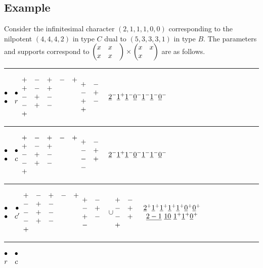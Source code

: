 \documentclass[11pt ,reqno]{amsart}
\begin{document}
\subsection{Example}\label{3.7} Consider the infinitesimal character
$(2,1,1,1,0,0)$ corresponding to the nilpotent $(4,4,4,2)$ in type $C$ dual to
$(5,3,3,3,1)$ in type $B.$ The parameters and supports correspond to
$\begin{pmatrix} x&x\\x&x&\end{pmatrix}\times\begin{pmatrix} x&x\\x&\end{pmatrix}$ are as follows.

\bigskip
\hrule
\medskip
$\begin{matrix} \bullet&\bullet\\ \bullet&r\end{matrix}$\qquad  
$\begin{matrix} +&-&+&-&+\\ +&-&+&&\\-&+&-&&\\-&+&-&&\\+&&&&\end{matrix}$
\qquad $\begin{matrix} +&-\\-&+\\+&-\\+&&\end{matrix}$
\qquad ${\underline{2}}^-{\underline{1}}^+{\underline{1}}^-{\underline{0}}^-{\underline{1}}^-{\underline{1}}^-{\underline{0}}^-$
\hfill
\medskip
\hrule
\medskip
$\begin{matrix} \bullet&\bullet\\ \bullet&c\end{matrix}$\qquad  
$\begin{matrix} +&-&+&-&+\\ +&-&+&&\\-&+&-&&\\-&+&-&&\\+&&&&\end{matrix}$
\qquad $\begin{matrix} +&-\\-&+\\-&+\\-&&\end{matrix}$
\qquad ${\underline{2}}^-{\underline{1}}^+{\underline{1}}^-{\underline{0}}^-{\underline{1}}^-{\underline{1}}^-{\underline{0}}^-$
\hfill
\medskip
\hrule
\medskip
$\begin{matrix} \bullet&\bullet\\ \bullet&c'\end{matrix}$\qquad  
$\begin{matrix} +&-&+&-&+\\ -&+&-&&\\-&+&-&&\\-&+&-&&\\+&&&&\end{matrix}$
\qquad $\begin{matrix} +&-\\-&+\\+&-\\-&&\end{matrix}\cup\begin{matrix} +&-\\-&+\\-&+\\+&&\end{matrix}$
\qquad 
\qquad $\begin{matrix} {\underline{2}}^+{\underline{1}}^+{\underline{1}}^+{\underline{1}}^+{\underline{1}}^+{\underline{0}}^+{\underline{0}}^+\\
{\underline{2-1}}\ {\underline{10}}\ {\underline{1}}^+{\underline{1}}^+{\underline{0}}^+\end{matrix}$
\hfill
\medskip
\hrule
\medskip
$\begin{matrix} \bullet&\bullet\\ r&c\end{matrix}$\qquad  
\end{document}
